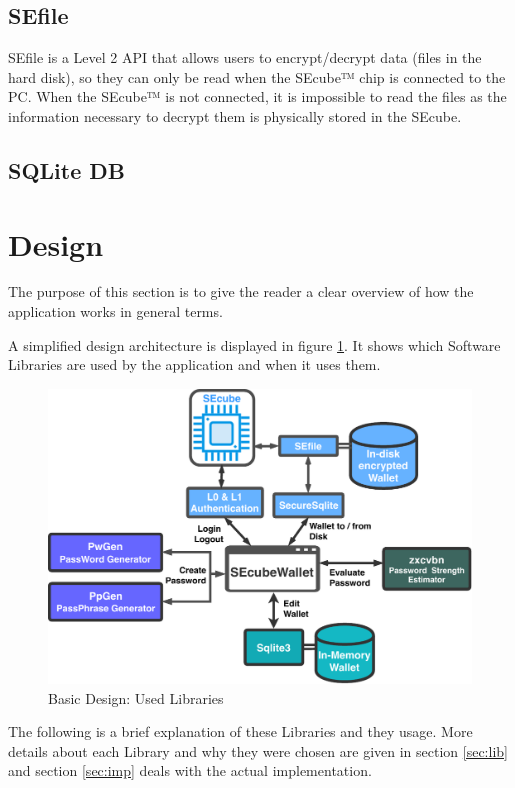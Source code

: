\subsection{SEfile} 
SEfile is a Level 2 API that allows users to encrypt/decrypt data (files in the hard disk), so they can only be read when the SEcube™ chip is connected to the PC. When the SEcube™ is not connected, it is impossible to read the files as the information necessary to decrypt them is physically stored in the SEcube.

\subsection{SQLite DB}

\section{Design}

The purpose of this section is to give the reader a clear overview of how the application works in general terms. 

A simplified design architecture is displayed in figure \ref{fig:BasicDesign}. It shows which Software Libraries are used by the application and when it uses them.


\begin{figure}[ht]
	\centering
	\includegraphics[width=\textwidth]{chapters/figures/development/BasicDesign.pdf}
	\caption{Basic Design: Used Libraries}
	\label{fig:BasicDesign}
\end{figure}

The following is a brief explanation of these Libraries and they usage. More details about each Library and why they were chosen are given in section \ref{sec:lib} and section \ref{sec:imp} deals with the actual implementation.

